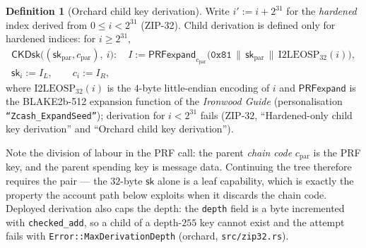 \documentclass[11pt,a4paper]{article}
\theoremstyle{definition}
\newtheorem{definition}[theorem]{Definition}
\begin{document}
\begin{definition}[Orchard child key derivation]\label{def:zip32-ckd}
Write $i' := i + 2^{31}$ for the \emph{hardened} index derived from
$0 \le i < 2^{31}$ (ZIP-32). Child derivation is defined only for hardened
indices: for $i \ge 2^{31}$,
\begin{gather*}
\mathsf{CKDsk}\bigl((\mathsf{sk}_{\mathrm{par}}, c_{\mathrm{par}}),\ i\bigr):
\quad
I := \mathsf{PRFexpand}_{c_{\mathrm{par}}}\bigl(\mathtt{0x81} \,\|\,
\mathsf{sk}_{\mathrm{par}} \,\|\, \mathrm{I2LEOSP}_{32}(i)\bigr), \\
\mathsf{sk}_i := I_L, \qquad c_i := I_R,
\end{gather*}
where $\mathrm{I2LEOSP}_{32}(i)$ is the $4$-byte little-endian encoding of
$i$ and $\mathsf{PRFexpand}$ is the BLAKE2b-512 expansion function of the
\emph{Ironwood Guide} (personalisation \texttt{``Zcash\_ExpandSeed''});
derivation for $i < 2^{31}$ fails (ZIP-32, ``Hardened-only child key
derivation'' and ``Orchard child key derivation'').
\end{definition}

Note the division of labour in the PRF call: the parent \emph{chain code}
$c_{\mathrm{par}}$ is the PRF key, and the parent spending key is message
data. Continuing the tree therefore requires the pair --- the $32$-byte
$\mathsf{sk}$ alone is a leaf capability, which is exactly the property the
account path below exploits when it discards the chain code. Deployed
derivation also caps the depth: the \texttt{depth} field is a byte
incremented with \texttt{checked\_add}, so a child of a depth-$255$ key
cannot exist and the attempt fails with
\texttt{Error::MaxDerivationDepth} (\textsf{orchard},
\texttt{src/zip32.rs}).
\end{document}
